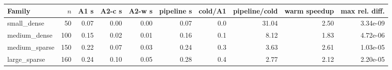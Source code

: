 \begin{tabular}{lrrrrrrrrr}
\toprule
Family & $n$ & A1 s & A2-c s & A2-w s & pipeline s & cold/A1 & pipeline/cold & warm speedup & max rel. diff. \\
\midrule
small\_dense & 50 & 0.07 & 0.00 & 0.00 & 0.07 & 0.0 & 31.04 & 2.50 & 3.34e-09 \\
medium\_dense & 100 & 0.15 & 0.02 & 0.01 & 0.16 & 0.1 & 8.12 & 1.83 & 4.72e-06 \\
medium\_sparse & 150 & 0.22 & 0.07 & 0.03 & 0.24 & 0.3 & 3.63 & 2.61 & 1.03e-05 \\
large\_sparse & 160 & 0.24 & 0.10 & 0.05 & 0.28 & 0.4 & 2.77 & 2.12 & 2.20e-05 \\
\bottomrule
\end{tabular}